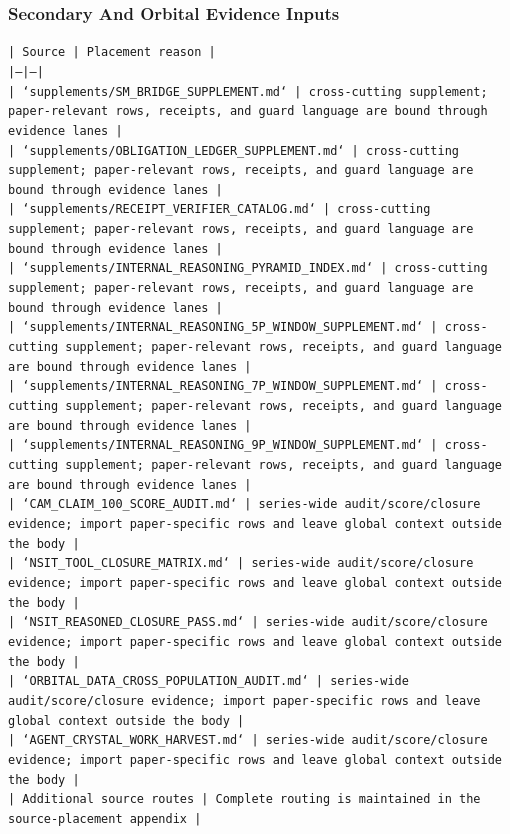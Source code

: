 \documentclass[11pt]{article}
\begin{document}
\subsubsection*{Secondary And Orbital Evidence Inputs}

\noindent\texttt{| Source | Placement reason |}\\
\noindent\texttt{|---|---|}\\
\noindent\texttt{| `supplements/SM\_BRIDGE\_SUPPLEMENT.md` | cross-cutting supplement; paper-relevant rows, receipts, and guard language are bound through evidence lanes |}\\
\noindent\texttt{| `supplements/OBLIGATION\_LEDGER\_SUPPLEMENT.md` | cross-cutting supplement; paper-relevant rows, receipts, and guard language are bound through evidence lanes |}\\
\noindent\texttt{| `supplements/RECEIPT\_VERIFIER\_CATALOG.md` | cross-cutting supplement; paper-relevant rows, receipts, and guard language are bound through evidence lanes |}\\
\noindent\texttt{| `supplements/INTERNAL\_REASONING\_PYRAMID\_INDEX.md` | cross-cutting supplement; paper-relevant rows, receipts, and guard language are bound through evidence lanes |}\\
\noindent\texttt{| `supplements/INTERNAL\_REASONING\_5P\_WINDOW\_SUPPLEMENT.md` | cross-cutting supplement; paper-relevant rows, receipts, and guard language are bound through evidence lanes |}\\
\noindent\texttt{| `supplements/INTERNAL\_REASONING\_7P\_WINDOW\_SUPPLEMENT.md` | cross-cutting supplement; paper-relevant rows, receipts, and guard language are bound through evidence lanes |}\\
\noindent\texttt{| `supplements/INTERNAL\_REASONING\_9P\_WINDOW\_SUPPLEMENT.md` | cross-cutting supplement; paper-relevant rows, receipts, and guard language are bound through evidence lanes |}\\
\noindent\texttt{| `CAM\_CLAIM\_100\_SCORE\_AUDIT.md` | series-wide audit/score/closure evidence; import paper-specific rows and leave global context outside the body |}\\
\noindent\texttt{| `NSIT\_TOOL\_CLOSURE\_MATRIX.md` | series-wide audit/score/closure evidence; import paper-specific rows and leave global context outside the body |}\\
\noindent\texttt{| `NSIT\_REASONED\_CLOSURE\_PASS.md` | series-wide audit/score/closure evidence; import paper-specific rows and leave global context outside the body |}\\
\noindent\texttt{| `ORBITAL\_DATA\_CROSS\_POPULATION\_AUDIT.md` | series-wide audit/score/closure evidence; import paper-specific rows and leave global context outside the body |}\\
\noindent\texttt{| `AGENT\_CRYSTAL\_WORK\_HARVEST.md` | series-wide audit/score/closure evidence; import paper-specific rows and leave global context outside the body |}\\
\noindent\texttt{| Additional source routes | Complete routing is maintained in the source-placement appendix |}\\
\end{document}
